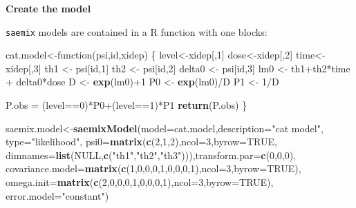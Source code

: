 \documentclass[]{book}
\newenvironment{Shaded}{\begin{snugshade}}{\end{snugshade}}
\newcommand{\KeywordTok}[1]{\textcolor[rgb]{0.13,0.29,0.53}{\textbf{{#1}}}}
\newcommand{\DataTypeTok}[1]{\textcolor[rgb]{0.13,0.29,0.53}{{#1}}}
\newcommand{\DecValTok}[1]{\textcolor[rgb]{0.00,0.00,0.81}{{#1}}}
\newcommand{\StringTok}[1]{\textcolor[rgb]{0.31,0.60,0.02}{{#1}}}
\newcommand{\OtherTok}[1]{\textcolor[rgb]{0.56,0.35,0.01}{{#1}}}
\newcommand{\NormalTok}[1]{{#1}}
\begin{document}
\textbf{Create the model}

\texttt{saemix} models are contained in a R function with one blocks:

\begin{Shaded}
\begin{Highlighting}[]
\NormalTok{cat.model<-function(psi,id,xidep) \{}
\NormalTok{level<-xidep[,}\DecValTok{1}\NormalTok{]}
\NormalTok{dose<-xidep[,}\DecValTok{2}\NormalTok{]}
\NormalTok{time<-xidep[,}\DecValTok{3}\NormalTok{]}
\NormalTok{th1 <-}\StringTok{ }\NormalTok{psi[id,}\DecValTok{1}\NormalTok{]}
\NormalTok{th2 <-}\StringTok{ }\NormalTok{psi[id,}\DecValTok{2}\NormalTok{]}
\NormalTok{delta0 <-}\StringTok{ }\NormalTok{psi[id,}\DecValTok{3}\NormalTok{]}
\NormalTok{lm0 <-}\StringTok{ }\NormalTok{th1+th2*time +}\StringTok{ }\NormalTok{delta0*dose}
\NormalTok{D <-}\StringTok{ }\KeywordTok{exp}\NormalTok{(lm0)+}\DecValTok{1}
\NormalTok{P0 <-}\StringTok{ }\KeywordTok{exp}\NormalTok{(lm0)/D}
\NormalTok{P1 <-}\StringTok{ }\DecValTok{1}\NormalTok{/D}

\NormalTok{P.obs =}\StringTok{ }\NormalTok{(level==}\DecValTok{0}\NormalTok{)*P0+(level==}\DecValTok{1}\NormalTok{)*P1}
\KeywordTok{return}\NormalTok{(P.obs) \}}

\NormalTok{saemix.model<-}\KeywordTok{saemixModel}\NormalTok{(}\DataTypeTok{model=}\NormalTok{cat.model,}\DataTypeTok{description=}\StringTok{"cat model"}\NormalTok{,}
  \DataTypeTok{type=}\StringTok{"likelihood"}\NormalTok{, }\DataTypeTok{psi0=}\KeywordTok{matrix}\NormalTok{(}\KeywordTok{c}\NormalTok{(}\DecValTok{2}\NormalTok{,}\DecValTok{1}\NormalTok{,}\DecValTok{2}\NormalTok{),}\DataTypeTok{ncol=}\DecValTok{3}\NormalTok{,}\DataTypeTok{byrow=}\OtherTok{TRUE}\NormalTok{,}
  \DataTypeTok{dimnames=}\KeywordTok{list}\NormalTok{(}\OtherTok{NULL}\NormalTok{,}\KeywordTok{c}\NormalTok{(}\StringTok{"th1"}\NormalTok{,}\StringTok{"th2"}\NormalTok{,}\StringTok{"th3"}\NormalTok{))),}\DataTypeTok{transform.par=}\KeywordTok{c}\NormalTok{(}\DecValTok{0}\NormalTok{,}\DecValTok{0}\NormalTok{,}\DecValTok{0}\NormalTok{),}
  \DataTypeTok{covariance.model=}\KeywordTok{matrix}\NormalTok{(}\KeywordTok{c}\NormalTok{(}\DecValTok{1}\NormalTok{,}\DecValTok{0}\NormalTok{,}\DecValTok{0}\NormalTok{,}\DecValTok{0}\NormalTok{,}\DecValTok{1}\NormalTok{,}\DecValTok{0}\NormalTok{,}\DecValTok{0}\NormalTok{,}\DecValTok{0}\NormalTok{,}\DecValTok{1}\NormalTok{),}\DataTypeTok{ncol=}\DecValTok{3}\NormalTok{,}\DataTypeTok{byrow=}\OtherTok{TRUE}\NormalTok{),}
  \DataTypeTok{omega.init=}\KeywordTok{matrix}\NormalTok{(}\KeywordTok{c}\NormalTok{(}\DecValTok{2}\NormalTok{,}\DecValTok{0}\NormalTok{,}\DecValTok{0}\NormalTok{,}\DecValTok{0}\NormalTok{,}\DecValTok{1}\NormalTok{,}\DecValTok{0}\NormalTok{,}\DecValTok{0}\NormalTok{,}\DecValTok{0}\NormalTok{,}\DecValTok{1}\NormalTok{),}\DataTypeTok{ncol=}\DecValTok{3}\NormalTok{,}\DataTypeTok{byrow=}\OtherTok{TRUE}\NormalTok{),}
  \DataTypeTok{error.model=}\StringTok{"constant"}\NormalTok{)}
\end{Highlighting}
\end{Shaded}
\end{document}
